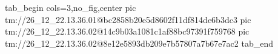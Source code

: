  
 
 
 
 

\qqSecOrig


\ifcmt
  tab_begin cols=3,no_fig,center
    pic tm://26_12_22.13.36.01@bc2858b20e5d8602f11df814de6b3dc3
    pic tm://26_12_22.13.36.02@14c9b03a1081c1af88bc97391f759768
    pic tm://26_12_22.13.36.02@8e12e5893db209e7b57807a7b67e7ac2
  tab_end
\fi

